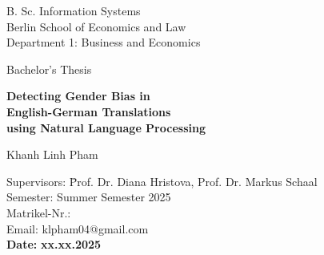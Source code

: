 \thispagestyle{empty}

\begin{center}

\vspace*{-10mm}

{\LARGE B. Sc. Information Systems\\[1mm]}
Berlin School of Economics and Law\\[1mm]
Department 1: Business and Economics\\
\vspace*{\fill} 

\vspace*{1cm}

{\Large {Bachelor's Thesis}}\\ 

\vspace{1cm}

{\Large \textbf{Detecting Gender Bias in}}\\ 
\vspace*{2mm}
{\Large \textbf{English-German Translations}}\\ 
\vspace*{2mm}
{\Large \textbf{using Natural Language Processing}}\\

\vspace{1.5cm}

{\LARGE Khanh Linh Pham}\\[15mm]

\vspace*{\fill} 

\parbox{120mm}{
\begin{large}
\begin{tabbing}
Supervisors: \hspace{.7cm} \=Prof. Dr. Diana Hristova, Prof. Dr. Markus Schaal\\[4mm]
Semester:\> Summer Semester 2025\\
Matrikel-Nr.:\\
Email:\> klpham04@gmail.com\\[8mm]
\textbf{Date:} \> \textbf{xx.xx.2025}\\
\end{tabbing}
\end{large}
}

\end{center}

\clearpage{\pagestyle{empty}\cleardoublepage}